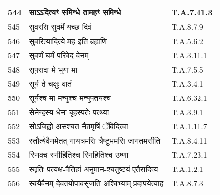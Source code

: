 \documentclass[17pt]{extarticle}
\begin{document}
\begin{longtable}{||p{0.4in}||p{4.9in}||p{0.9in}||}
    \hline
        
    544 & साऽऽदित्यꣳ समिन्धे तामहꣳ समिन्धे & T.A.7.41.3       \\
    
    \hline
        
    545 & सुवरसि सुवर्मे यच्छ दिवं & T.A.8.7.9       \\
    
    \hline
        
    546 & सुवरित्यादित्ये मह इति ब्रह्मणि & T.A.5.6.2       \\
    
    \hline
        
    547 & सुवर्णं घर्मं परिवेद वेनम् & T.A.3.11.1       \\
    
    \hline
        
    548 & सूपसदा मे भूया मा & T.A.7.5.5       \\
    
    \hline
        
    549 & सूर्यं ते चक्षुः वातं & T.A.3.4.1       \\
    
    \hline
        
    550 & सूर्यश्च मा मन्युश्च मन्युपतयश्च & T.A.6.32.1       \\
    
    \hline
        
    551 & सेनेन्द्रस्य धेना बृहस्पतेः पत्थ्या & T.A.3.9.1       \\
    
    \hline
        
    552 & सोऽजिह्वो असश्चत नैतमृषिं ॅविदित्वा & T.A.1.11.7       \\
    
    \hline
        
    553 & स्तौत्येवैनमेतत् गायत्रमसि त्रैष्टुभमसि जागतमसीति & T.A.8.4.11       \\
    
    \hline
        
    554 & स्निक्च स्नीहितिश्च स्निहितिश्च उष्णा & T.A.7.23.1       \\
    
    \hline
        
    555 & स्मृतिः प्रत्यक्ष{-}मैतिह्यं अनुमान{-}श्चतुष्टयं एतैरादित्य & T.A.1.2.1       \\
    
    \hline
        
    556 & स्वयैवैनम् देवतयोपावसृजति अश्विभ्याम् प्रदापयेत्याह & T.A.8.7.3       \\
    

\end{longtable}
\end{document}
